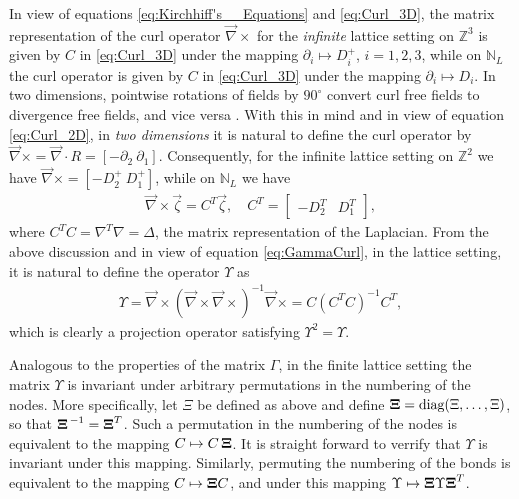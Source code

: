 \documentclass{cmslatex}
\newcommand\bXi{\mbox{\boldmath${\Xi}$}}
\begin{document}
In view of equations \eqref{eq:Kirchhiff's__Equations} and
\eqref{eq:Curl_3D}, the matrix representation of the curl operator
$\vec{\nabla}\times$ for the \emph{infinite} lattice setting on $\mathbb{Z}^3$
is given by $C$ in \eqref{eq:Curl_3D} under the mapping $\partial_i\mapsto D^+_i$,
$i=1,2,3$, while on $\mathbb{N}_L$ the curl operator is given by
$C$ in \eqref{eq:Curl_3D} under the mapping $\partial_i\mapsto D_i$. In two
dimensions, pointwise rotations of fields by $90^\circ$ convert curl free
fields to divergence free fields, and vice versa
\cite{MILTON:2002:TC}. With this in mind and in view of equation
\eqref{eq:Curl_2D}, in \emph{two dimensions} it is natural to define
the curl operator by $\vec{\nabla}\times=\vec{\nabla}\cdot R=[ - \partial_2 \
\partial_1]$. Consequently, for the infinite lattice setting on
$\mathbb{Z}^2$ we have $\vec{\nabla}\times=[ - D^+_2 \ D^+_1]$, while on
$\mathbb{N}_L$ we have  
%
\begin{align}
  \vec{\nabla}\times\vec{\zeta}=C^T\vec{\zeta}, \quad
  C^T=
  \left[
    \begin{array}{ccc}
       -D_2^T  &   D_1^T
    \end{array}
  \right],
\end{align}
%
where $C^TC=\nabla^T\nabla=\Delta$, the matrix representation of the Laplacian. From
the above discussion and in view of equation \eqref{eq:GammaCurl}, in
the lattice setting, it is natural to define the operator $\Upsilon$ as
%
\begin{align}\label{eq:GammaCurl_NL}
  \Upsilon=\vec{\nabla}\times(\vec{\nabla}\times\vec{\nabla}\times)^{-1}\vec{\nabla}\times
   =C(C^TC)^{-1}C^T,
\end{align}
%
which is clearly a projection operator satisfying $\Upsilon^2=\Upsilon$.




Analogous
to the properties of the matrix $\Gamma$, in the finite lattice setting the 
matrix $\Upsilon$ is invariant under arbitrary permutations in the numbering
of the nodes. More specifically, let $\Xi$ be defined as above and
define $\bXi=\text{diag}(\Xi,\ldots,\Xi)$, so that $\bXi^{\,-1}=\bXi^T$. Such a
permutation in the 
numbering of the nodes is equivalent to the mapping
$C\mapsto C\,\bXi$. It is straight forward to verrify that $\Upsilon$ is invariant
under this mapping. Similarly, permuting the numbering of
the bonds is equivalent to the mapping $C\mapsto \bXi C$, and under
this mapping $\Upsilon\mapsto \bXi \Upsilon {\bXi}^T$.  
\end{document}
